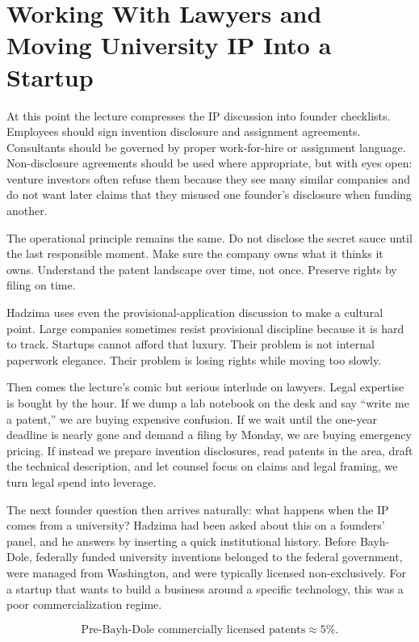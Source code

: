 \section{Working With Lawyers and Moving University IP Into a Startup}

At this point the lecture compresses the IP discussion into founder checklists. Employees should sign invention disclosure and assignment agreements. Consultants should be governed by proper work-for-hire or assignment language. Non-disclosure agreements should be used where appropriate, but with eyes open: venture investors often refuse them because they see many similar companies and do not want later claims that they misused one founder's disclosure when funding another.

The operational principle remains the same. Do not disclose the secret sauce until the last responsible moment. Make sure the company owns what it thinks it owns. Understand the patent landscape over time, not once. Preserve rights by filing on time.

Hadzima uses even the provisional-application discussion to make a cultural point. Large companies sometimes resist provisional discipline because it is hard to track. Startups cannot afford that luxury. Their problem is not internal paperwork elegance. Their problem is losing rights while moving too slowly.

Then comes the lecture's comic but serious interlude on lawyers. Legal expertise is bought by the hour. If we dump a lab notebook on the desk and say ``write me a patent,'' we are buying expensive confusion. If we wait until the one-year deadline is nearly gone and demand a filing by Monday, we are buying emergency pricing. If instead we prepare invention disclosures, read patents in the area, draft the technical description, and let counsel focus on claims and legal framing, we turn legal spend into leverage.

The next founder question then arrives naturally: what happens when the IP comes from a university? Hadzima had been asked about this on a founders' panel, and he answers by inserting a quick institutional history. Before Bayh-Dole, federally funded university inventions belonged to the federal government, were managed from Washington, and were typically licensed non-exclusively. For a startup that wants to build a business around a specific technology, this was a poor commercialization regime.

\begin{equation}
\text{Pre-Bayh-Dole commercially licensed patents}\approx 5\%.
\end{equation}

